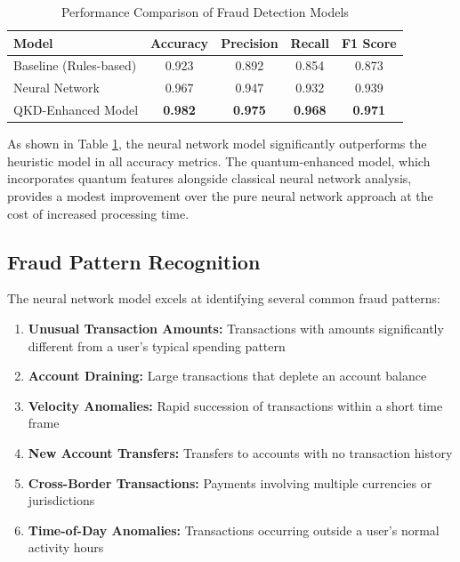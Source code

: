 \documentclass[onecolumn,a4paper,10pt]{IEEEtran}
\let\originalfloatbarrier\FloatBarrier
\renewcommand{\FloatBarrier}{\originalfloatbarrier}
\begin{document}
\begin{table}[!htb]
\small
\centering
\begin{tabular}{|p{3.5cm}|c|c|c|c|}
\hline
\cellcolor{lightblue!30}\textbf{Model} & \cellcolor{lightblue!30}\textbf{Accuracy} & \cellcolor{lightblue!30}\textbf{Precision} & \cellcolor{lightblue!30}\textbf{Recall} & \cellcolor{lightblue!30}\textbf{F1 Score} \\
\hline
Baseline (Rules-based) & 0.923 & 0.892 & 0.854 & 0.873 \\
\hline
Neural Network & 0.967 & 0.947 & 0.932 & 0.939 \\
\hline
QKD-Enhanced Model & \textbf{0.982} & \textbf{0.975} & \textbf{0.968} & \textbf{0.971} \\
\hline
\end{tabular}
\caption{Performance Comparison of Fraud Detection Models}
\label{table:performance}
\end{table}
\FloatBarrier

As shown in Table \ref{table:performance}, the neural network model significantly outperforms the heuristic model in all accuracy metrics. The quantum-enhanced model, which incorporates quantum features alongside classical neural network analysis, provides a modest improvement over the pure neural network approach at the cost of increased processing time.

\subsection{Fraud Pattern Recognition}

The neural network model excels at identifying several common fraud patterns:

\begin{enumerate}
    \item \textbf{Unusual Transaction Amounts:} Transactions with amounts significantly different from a user's typical spending pattern
    \item \textbf{Account Draining:} Large transactions that deplete an account balance
    \item \textbf{Velocity Anomalies:} Rapid succession of transactions within a short time frame
    \item \textbf{New Account Transfers:} Transfers to accounts with no transaction history
    \item \textbf{Cross-Border Transactions:} Payments involving multiple currencies or jurisdictions
    \item \textbf{Time-of-Day Anomalies:} Transactions occurring outside a user's normal activity hours
\end{enumerate}
\end{document}
